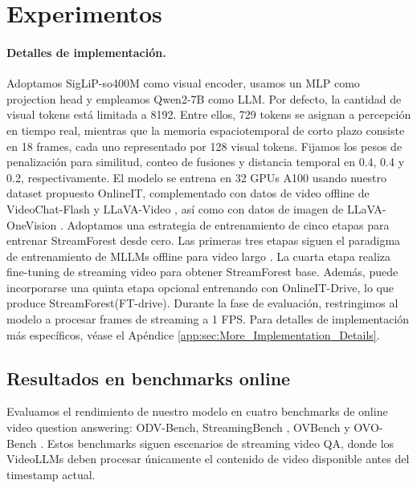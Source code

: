 \section{Experimentos}
\label{sec:Experiments}

\paragraph{Detalles de implementación.} Adoptamos SigLiP-so400M\cite{zhai2023siglip} como visual encoder, usamos un MLP como projection head y empleamos Qwen2-7B como LLM. Por defecto, la cantidad de visual tokens está limitada a 8192. Entre ellos, 729 tokens se asignan a percepción en tiempo real, mientras que la memoria espaciotemporal de corto plazo consiste en 18 frames, cada uno representado por 128 visual tokens. Fijamos los pesos de penalización para similitud, conteo de fusiones y distancia temporal en 0.4, 0.4 y 0.2, respectivamente. El modelo se entrena en 32 GPUs A100 usando nuestro dataset propuesto OnlineIT, complementado con datos de video offline de VideoChat-Flash \cite{li2024videochatflash} y LLaVA-Video \cite{zhang2024llavavideo}, así como con datos de imagen de LLaVA-OneVision \cite{li2024llavaov}. Adoptamos una estrategia de entrenamiento de cinco etapas para entrenar StreamForest desde cero. Las primeras tres etapas siguen el paradigma de entrenamiento de MLLMs offline para video largo \cite{li2024videochatflash}. La cuarta etapa realiza fine-tuning de streaming video para obtener StreamForest base. Además, puede incorporarse una quinta etapa opcional entrenando con OnlineIT-Drive, lo que produce StreamForest(FT-drive). Durante la fase de evaluación, restringimos al modelo a procesar frames de streaming a 1 FPS. Para detalles de implementación más específicos, véase el Apéndice \ref{app:sec:More_Implementation_Details}.


\subsection{Resultados en benchmarks online}

Evaluamos el rendimiento de nuestro modelo en cuatro benchmarks de online video question answering: ODV-Bench, StreamingBench \cite{lin2024streamingbench}, OVBench \cite{huang2024videochatonline} y OVO-Bench \cite{li2025ovobench}. Estos benchmarks siguen escenarios de streaming video QA, donde los VideoLLMs deben procesar únicamente el contenido de video disponible antes del timestamp actual.





